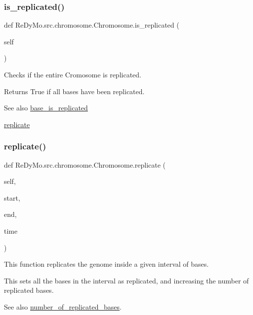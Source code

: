 \subsubsection{\texorpdfstring{is\+\_\+replicated()}{is\_replicated()}}
{\footnotesize\ttfamily def Re\+Dy\+Mo.\+src.\+chromosome.\+Chromosome.\+is\+\_\+replicated (\begin{DoxyParamCaption}\item[{}]{self }\end{DoxyParamCaption})}



Checks if the entire Cromosome is replicated. 

\begin{DoxyReturn}{Returns}
True if all bases have been replicated. 
\end{DoxyReturn}
\begin{DoxySeeAlso}{See also}
\mbox{\hyperlink{classReDyMo_1_1src_1_1chromosome_1_1Chromosome_a1dba7152914a8f8006a5ddfcaad82c31}{base\+\_\+is\+\_\+replicated}} 

\mbox{\hyperlink{classReDyMo_1_1src_1_1chromosome_1_1Chromosome_aac8462677b62589ca8f103c047c5c014}{replicate}} 
\end{DoxySeeAlso}
\mbox{\label{classReDyMo_1_1src_1_1chromosome_1_1Chromosome_aac8462677b62589ca8f103c047c5c014}} 
\subsubsection{\texorpdfstring{replicate()}{replicate()}}
{\footnotesize\ttfamily def Re\+Dy\+Mo.\+src.\+chromosome.\+Chromosome.\+replicate (\begin{DoxyParamCaption}\item[{}]{self,  }\item[{}]{start,  }\item[{}]{end,  }\item[{}]{time }\end{DoxyParamCaption})}



This function replicates the genome inside a given interval of bases. 

This sets all the bases in the interval as replicated, and increasing the number of replicated bases. \begin{DoxySeeAlso}{See also}
\mbox{\hyperlink{classReDyMo_1_1src_1_1chromosome_1_1Chromosome_a0ce8da5c0773f1d5d6e668b26d498875}{number\+\_\+of\+\_\+replicated\+\_\+bases}}. 
\end{DoxySeeAlso}

